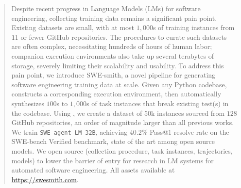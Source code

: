 \begin{abstract}
Despite recent progress in Language Models (LMs) for software engineering, collecting training data remains a significant pain point.
Existing datasets are small, with at most $1{,}000$s of training instances from $11$ or fewer GitHub repositories.
The procedures to curate such datasets are often complex, necessitating hundreds of hours of human labor; companion execution environments also take up several terabytes of storage, severely limiting their scalability and usability.
To address this pain point, we introduce SWE-smith, a novel pipeline for generating software engineering training data at scale.
Given any Python codebase, \bugs{} constructs a corresponding execution environment, then automatically synthesizes $100$s to $1{,}000$s of task instances that break existing test(s) in the codebase.
Using \bugs{}, we create a dataset of $50$k instances sourced from $128$ GitHub repositories, an order of magnitude larger than all previous works.
We train \texttt{SWE-agent-LM-32B}, achieving $40.2$\% Pass@1 resolve rate on the SWE-bench Verified benchmark, state of the art among open source models.
We open source \bugs{} (collection procedure, task instances, trajectories, models) to lower the barrier of entry for research in LM systems for automated software engineering.
All assets available at \url{https://swesmith.com}.
\end{abstract}